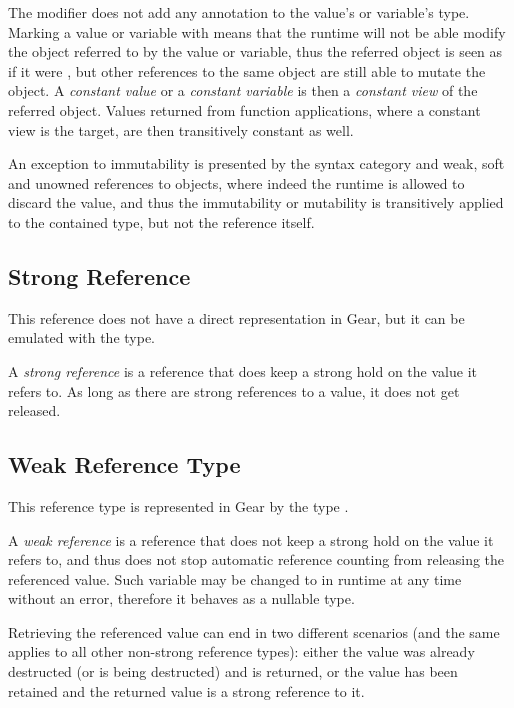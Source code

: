 The  modifier does not add any annotation to the value's or variable's type. Marking a value or variable with  means that the runtime will not be able modify the object referred to by the value or variable, thus the referred object is seen as if it were , but other references to the same object are still able to mutate the object. A {\em constant value} or a {\em constant variable} is then a {\em constant view} of the referred object. Values returned from function applications, where a constant view is the target, are then transitively constant as well. 

An exception to immutability is presented by the  syntax category and weak, soft and unowned references to objects, where indeed the runtime is allowed to discard the value, and thus the immutability or mutability is transitively applied to the contained type, but not the reference itself. 






\subsection{Strong Reference}

This reference does not have a direct representation in Gear, but it can be emulated with the  type. 

A {\em strong reference} is a reference that does keep a strong hold on the value it refers to. As long as there are strong references to a value, it does not get released. 






\subsection{Weak Reference Type}

This reference type is represented in Gear by the type . 

A {\em weak reference} is a reference that does not keep a strong hold on the value it refers to, and thus does not stop automatic reference counting from releasing the referenced value. Such variable may be changed to  in runtime at any time without an error, therefore it behaves as a nullable type. 

Retrieving the referenced value can end in two different scenarios (and the same applies to all other non-strong reference types): either the value was already destructed (or is being destructed) and  is returned, or the value has been retained and the returned value is a strong reference to it. 

